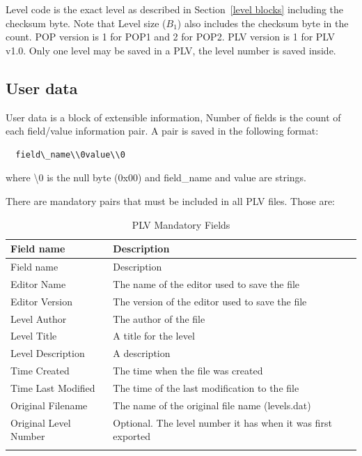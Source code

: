 \documentclass{article}
\begin{document}
 Level code is the exact level as described in Section~\ref{level blocks} including the checksum
 byte. Note that Level size ($B_1$) also includes the checksum byte in the
 count.
 POP version is 1 for POP1 and 2 for POP2.
 PLV version is 1 for PLV v1.0.
 Only one level may be saved in a PLV, the level number is saved inside.

\subsection{User data}

 User data is a block of extensible information, Number of fields is the
 count of each field/value information pair. A pair is saved in the
 following format:
\begin{verbatim}
  field\_name\\0value\\0
\end{verbatim}
 where \textbackslash0 is the null byte (0x00) and field\_name and value are strings.

 There are mandatory pairs that must be included in all PLV files.
 Those are:

\begin{longtable}{lp{7cm}}
\hline
 Field name             & Description \\
\hline
\endfirsthead
\hline
 Field name             & Description \\
\hline
\endhead
\hline
 Editor Name            & The name of the editor used to save the file \\
 Editor Version         & The version of the editor used to save the file \\
 Level Author           & The author of the file \\
 Level Title            & A title for the level \\
 Level Description      & A description \\
 Time Created           & The time when the file was created \\
 Time Last Modified     & The time of the last modification to the file \\
 Original Filename      & The name of the original file name (levels.dat) \\
 Original Level Number  & Optional. The level number it has when it was first exported \\
\hline
\caption{PLV Mandatory Fields}
\label{plv mandatory fields}
\end{longtable}
 
\end{document}
